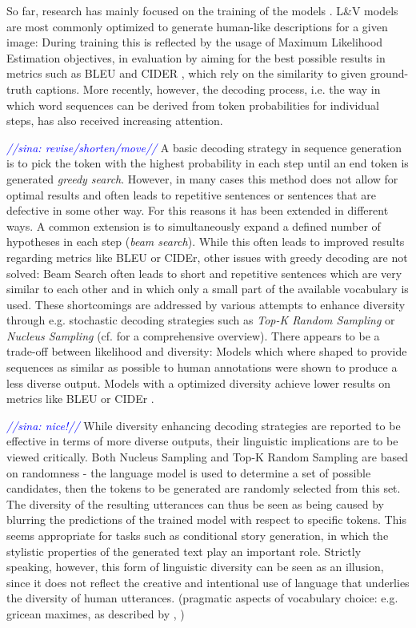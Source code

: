 \documentclass[11pt,a4paper]{article}
\newcommand{\sina}[1]{\textcolor{blue}{\emph{//sina: #1//}}}
\begin{document}
So far, research has mainly focused on the training of the models \citep{zarriess-schlangen-2018-decoding}.
L\&V models are most commonly optimized to generate human-like descriptions for a given image: During training this is reflected by the usage of Maximum Likelihood Estimation objectives, in evaluation by aiming for the best possible results in metrics such as BLEU \citep{papineni-etal-2002-bleu} and CIDER \citep{Vedantam2014}, which rely on the similarity to given ground-truth captions. 
More recently, however, the decoding process, i.e. the way in which word sequences can be derived from token probabilities for individual steps, has also received increasing attention.

\sina{revise/shorten/move} A basic decoding strategy in sequence generation is to pick the token with the highest probability in each step until an end token is generated \textit{greedy search}. However, in many cases this method does not allow for optimal results and often leads to repetitive sentences or sentences that are defective in some other way. For this reasons it has been extended in different ways. 
A common extension is to simultaneously expand a defined number of hypotheses in each step (\textit{beam search}). While this often leads to improved results regarding metrics like BLEU or CIDEr, other issues with greedy decoding are not solved: Beam Search often leads to short and repetitive sentences which are very similar to each other and in which only a small part of the available vocabulary is used. 
These shortcomings are addressed by various attempts to enhance diversity through e.g. stochastic decoding strategies such as \textit{Top-K Random Sampling} \citep{fan-etal-2018-hierarchical} or \textit{Nucleus Sampling} \citep{Holtzman2019} (cf. \citet{Ippolito2019} for a comprehensive overview). There appears to be a trade-off between likelihood and diversity: Models which where shaped to provide sequences as similar as possible to human annotations were shown to produce a less diverse output. Models with a optimized diversity achieve lower results on metrics like BLEU or CIDEr \citep{Wang2019}.

\sina{nice!} While diversity enhancing decoding strategies are reported to be effective in terms of more diverse outputs, their linguistic implications are to be viewed critically. Both Nucleus Sampling and Top-K Random Sampling are based on randomness - the language model is used to determine a set of possible candidates, then the tokens to be generated are randomly selected from this set. The diversity of the resulting utterances can thus be seen as being caused by blurring the predictions of the trained model with respect to specific tokens. This seems appropriate for tasks such as conditional story generation, in which the stylistic properties of the generated text play an important role. 
Strictly speaking, however, this form of linguistic diversity can be seen as an illusion, since it does not reflect the creative and intentional use of language that underlies the diversity of human utterances. (pragmatic aspects of vocabulary choice: e.g. gricean maximes, as described by \citet{Cruse1977} \citep{reiter-1990-new}, \citep{Reiter1991})
\end{document}
